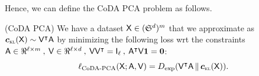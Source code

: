 \documentclass{article}
\begin{document}



Hence, we can define the CoDA PCA problem as follows.
\begin{mdframed}[style=MyFrame,nobreak=True]
(CoDA PCA) We have a dataset $\mathsf{X} \in (\mathfrak{S}^{d})^m$ that we approximate as
$\clrlog(\X) \sim \V^\top \A$ by minimizing the following loss wrt the constraints
$\mathsf{A} \in \Re^{\ell \times m}\:,\:\mathsf{V} \in \Re^{\ell \times d}\:,\:\mathsf{V} \mathsf{V}^\intercal = \mathsf{I}_\ell\:,\:\mathsf{A}^\intercal\mathsf{V}\bm{1} = \bm{0}$:
\begin{equation}
\ell_{\mathrm{CoDA\text{-}PCA}}(\X; \A, \V)\label{pb-CoDA}
= D_{\exp}(\V^\top \A\,\Vert\,\clrlog({\X})).
\end{equation}
\end{mdframed}
\end{document}
